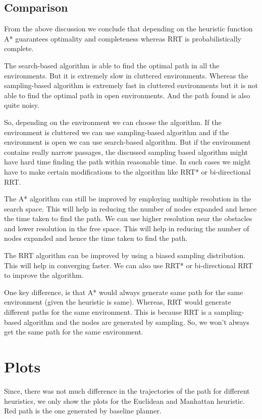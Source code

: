 \documentclass[conference]{IEEEtran}
\begin{document}
\subsection{Comparison}
From the above discussion we conclude that depending on the heuristic function A* guarantees optimality and completeness whereas RRT is probabilistically complete.
\par The search-based algorithm is able to find the optimal path in all the environments. But it is extremely slow in cluttered environments. Whereas the sampling-based algorithm is extremely fast in cluttered environments but it is not able to find the optimal path in open environments. And the path found is also quite noisy.
\par So, depending on the environment we can choose the algorithm. If the environment is cluttered we can use sampling-based algorithm and if the environment is open we can use search-based algorithm. But if the environment contains really narrow passages, the discussed sampling based algorithm might have hard time finding the path within reasonable time. In such cases we might have to make certain modifications to the algorithm like RRT* or bi-directional RRT.
\par The A* algorithm can still be improved by employing multiple resolution in the search space. This will help in reducing the number of nodes expanded and hence the time taken to find the path. We can use higher resolution near the obstacles and lower resolution in the free space. This will help in reducing the number of nodes expanded and hence the time taken to find the path.
\par The RRT algorithm can be improved by using a biased sampling distribution. This will help in converging faster. We can also use RRT* or bi-directional RRT to improve the algorithm.
\par One key difference, is that A* would always generate same path for the same environment (given the heuristic is same). Whereas, RRT would generate different paths for the same environment. This is because RRT is a sampling-based algorithm and the nodes are generated by sampling. So, we won't always get the same path for the same environment.
\section{Plots}
Since, there was not much difference in the trajectories of the path for different heuristics, we only show the plots for the Euclidean and Manhattan heuristic.
Red path is the one generated by baseline planner.
\end{document}
